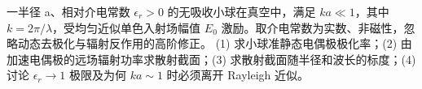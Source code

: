 一半径 a、相对介电常数 \(\epsilon_r>0\) 的无吸收小球在真空中，满足 \(ka\ll1\)，其中 \(k=2\pi/\lambda\)，受均匀近似单色入射场幅值 \(E_0\) 激励。取介电常数为实数、非磁性，忽略动态去极化与辐射反作用的高阶修正。
(1) 求小球准静态电偶极极化率；(2) 由加速电偶极的远场辐射功率求散射截面；(3) 求散射截面随半径和波长的标度；(4) 讨论 \(\epsilon_r\to1\) 极限及为何 \(ka\sim1\) 时必须离开 Rayleigh 近似。
